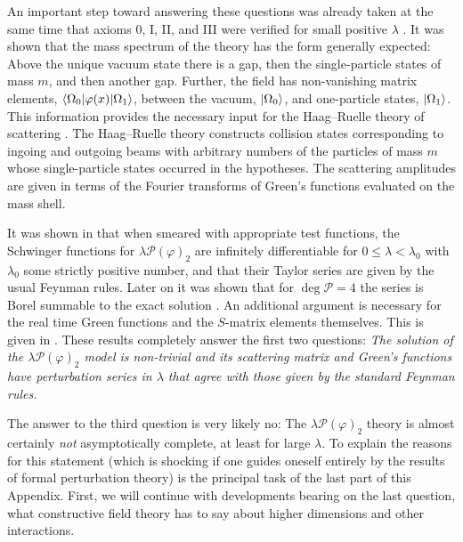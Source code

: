 An important step toward answering these questions was already taken at the
same time that axioms 0, I, II, and III were verified for small positive
$\lambda$ \cite{pct-app-45}. It was shown that the mass spectrum of the theory has the form
generally expected: Above the unique vacuum state there is a gap, then the
single-particle states of mass $m$, and then another gap. Further, the field has
non-vanishing matrix elements,
$\langle \Omega_0\vert \varphi(x)\vert \Omega_1\rangle$, between the vacuum,
$\lvert \Omega_0\rangle$, and one-particle states,
$\lvert \Omega_1\rangle$. This information provides the necessary input for the
Haag--Ruelle theory of scattering \cite{pct-app-48,pct-app-49}. The Haag--Ruelle theory constructs
collision states corresponding to ingoing and outgoing beams with arbitrary
numbers of the particles of mass $m$ whose single-particle states occurred in
the hypotheses. The scattering amplitudes are given in terms of the Fourier
transforms of Green's functions evaluated on the mass shell.

It was shown in \cite{pct-app-50} that when smeared with appropriate test functions, the
Schwinger functions for $\lambda\mathcal{P}(\varphi)_2$ are infinitely
differentiable for $0\leq\lambda<\lambda_0$ with $\lambda_0$ some strictly
positive number, and that their Taylor series are given by the usual Feynman
rules. Later on it was shown that for $\deg\mathcal{P}=4$ the series is Borel
summable to the exact solution \cite{pct-app-51}. An additional argument is necessary for
the real time Green functions and the $S$-matrix elements themselves. This is
given in \cite{pct-app-52,pct-app-53,pct-app-54}. These results completely answer the first two questions:
\emph{The solution of the $\lambda\mathcal{P}(\varphi)_2$ model is
non-trivial and its scattering matrix and Green's functions have perturbation
series in $\lambda$ that agree with those given by the standard Feynman
rules.}

The answer to the third question is very likely no: The $\lambda\mathcal{P}(\varphi)_2$
theory is almost certainly \emph{not} asymptotically complete, at least for
large $\lambda$. To explain the reasons for this statement (which is shocking
if one guides oneself entirely by the results of formal perturbation theory)
is the principal task of the last part of this Appendix. First, we will
continue with developments bearing on the last question, what constructive
field theory has to say about higher dimensions and other interactions.

